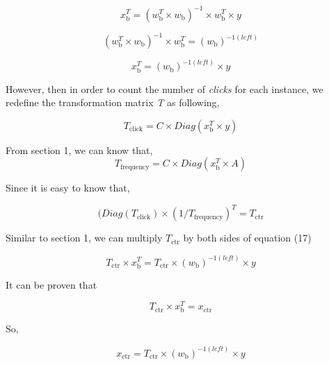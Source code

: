 \documentclass{sig-alternate}
\begin{document}
\begin{equation}
x_{\text{b}}^T = (w_{\text{b}}^T \times w_{\text{b}})^{-1} \times w_{\text{b}}^T \times y 
\end{equation}

\begin{equation}
(w_{\text{b}}^T \times w_{\text{b}})^{-1} \times w_{\text{b}}^T = (w_{\text{b}})^{-1(left)}  
\end{equation}

\begin{equation}
x_{\text{b}}^T =  (w_{\text{b}})^{-1(left)} \times y 
\end{equation}

However, then in order to count the number of \textsl{clicks} for each instance, we redefine the transformation matrix \textsl{T} as following, 

\begin{equation}
T_{\text{click}} = C \times Diag(x_{\text{b}}^T \times y)
\end{equation}



From section 1, we can know that, 
\begin{equation}
T_{\text{frequency}} = C \times Diag(x_{\text{b}}^T \times A)
\end{equation}

Since it is easy to know that,

\begin{equation}
(Diag(T_{\text{click}}) \times (1/T_{\text{frequency}} )^T =  T_{\text{ctr}}
\end{equation}

Similar to section 1, we can multiply \(T_{\text{ctr}}\) by both sides of equation (17)

\begin{equation}
T_{\text{ctr}} \times x_{\text{b}}^T =  T_{\text{ctr}} \times (w_{\text{b}})^{-1(left)} \times y 
\end{equation}

It can be proven that 

\begin{equation}
T_{\text{ctr}} \times x_{\text{b}}^T =  x_{\text{ctr}}
\end{equation}

So,

\begin{equation}
 x_{\text{ctr}} =  T_{\text{ctr}} \times (w_{\text{b}})^{-1(left)} \times y 
\end{equation}
\end{document}
